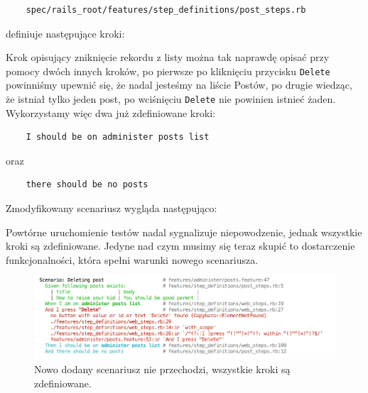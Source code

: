     \begin{lstlisting}
    spec/rails_root/features/step_definitions/post_steps.rb
    \end{lstlisting}
    
    definiuje następujące kroki:
    
    
    
    Krok opisujący zniknięcie rekordu z listy można tak naprawdę opisać przy pomocy dwóch innych kroków, po pierwsze po kliknięciu przycisku \verb+Delete+ powinniśmy upewnić się, że nadal jesteśmy na liście Postów, po drugie wiedząc, że istniał tylko jeden post, po wciśnięciu \verb+Delete+ nie powinien istnieć żaden. Wykorzystamy więc dwa już zdefiniowane kroki: 
    
    \begin{lstlisting}
    I should be on administer posts list
    \end{lstlisting}
    
    oraz 
    
    \begin{lstlisting}
    there should be no posts
    \end{lstlisting}
    
    Zmodyfikowany scenariusz wygląda następująco:
    
    
    
    Powtórne uruchomienie testów nadal sygnalizuje niepowodzenie, jednak wszystkie kroki są zdefiniowane. Jedyne nad czym musimy się teraz skupić to dostarczenie funkcjonalności, która spełni warunki nowego scenariusza.
     
     \clearpage
     
     \begin{figure}[!h]
   		\begin{center}
   			\includegraphics[width=\linewidth]{images/scenario_failure_2.png}
   			\caption{Nowo dodany scenariusz nie przechodzi, wszystkie kroki są zdefiniowane.}
   			\label{scenario_failure_2}
   		\end{center}
   	\end{figure}
   	

